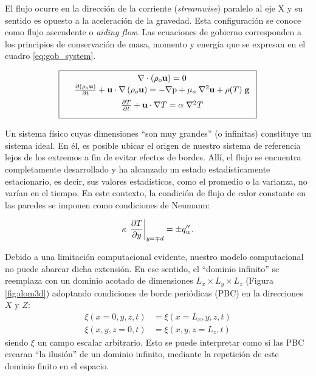 El flujo ocurre en la dirección de la corriente (\textit{streamwise}) paralelo al eje X y su sentido es opuesto a la aceleración de la gravedad. Esta configuración se conoce como flujo ascendente o \textit{aiding flow}. Las ecuaciones de gobierno corresponden a los principios de conservación de masa, momento y energía que se expresan en el cuadro \ref{eq:gob_system}.

\begin{equation}
        \boxed{ \begin{array}{lcc}
              &  \nabla \cdot \left( \rho_o \mathbf{u} \right) = 0 \\
              \vspace*{2mm}
              &  \frac{\partial \left( \rho_o \mathbf{u} \right)}{\partial t} + \mathbf{u} \cdot \nabla  \left( \rho_o \mathbf{u} \right) = -\nabla \text{p} + \mu_o \hspace{1mm} {\nabla}^2 \mathbf{u}  + \rho(T) \hspace{1mm} \mathbf{g} \\
              \vspace*{2mm}
              &  \frac{\partial T}{\partial t} + \mathbf{u} \cdot \nabla T =  \alpha \hspace{1mm} \nabla^2 T  \\
             \end{array}
               }
             \label{eq:gob_system}
\end{equation}

Un sistema físico cuyas dimensiones ``son muy grandes'' (o infinitas) constituye un sistema ideal. En él, es posible ubicar el origen de nuestro sistema de referencia lejos de los extremos a fin de evitar efectos de bordes. Allí, el flujo se encuentra completamente desarrollado y ha alcanzado un estado estadísticamente estacionario, es decir, sus valores estadísticos, como el promedio o la varianza, no varían en el tiempo. En este contexto, la condición de flujo de calor constante en las paredes se imponen como condiciones de Neumann:

\begin{equation}
\kappa \hspace{0.5mm} \left. \frac{\partial T}{\partial y} \right\vert_{y=\mp d} = \pm q''_w \text{.}
\label{eq:neumann}
\end{equation}

Debido a una limitación computacional evidente, nuestro modelo computacional no puede abarcar dicha extensión. En ese sentido, el ``dominio infinito'' se reemplaza con un dominio acotado de dimensiones $L_x \times L_y \times L_z$ (Figura \ref{fig:dom3d}) adoptando condiciones de borde periódicas (PBC) en la direcciones $X$ y $Z$:
\begin{align}
\xi(x=0,y,z,t) &= \xi(x=L_x,y,z,t) \\ 
\xi(x,y,z=0,t) &= \xi(x,y,z=L_z,t)
\end{align}
siendo $\xi$ un campo escalar arbitrario. Esto se puede interpretar como si las PBC crearan ``la ilusión'' de un dominio infinito, mediante la repetición de este dominio finito en el espacio.

